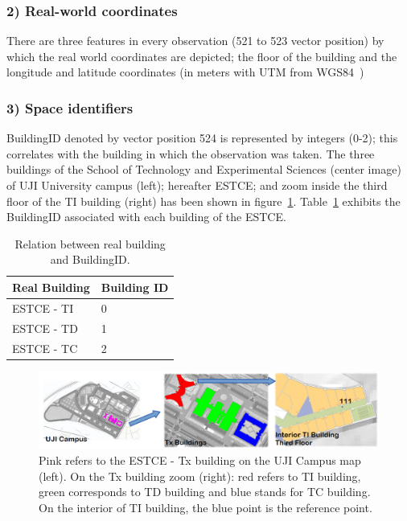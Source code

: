 \documentclass[a4paper,singleside,12pt]{report} %
\begin{document}
				\subsubsection{2) Real-world coordinates}

					There are three features in every observation (521 to 523 vector position) by which the real world coordinates are depicted; the floor of the building and the longitude and latitude coordinates (in meters with UTM from WGS84~\cite{janssen2009understanding})

				\subsubsection{3) Space identifiers}

					BuildingID denoted by vector position 524 is represented by integers (0-2); this correlates with the building in which the observation was taken. 
					The three buildings of the School of Technology and Experimental Sciences (center image) of UJI University campus (left); hereafter ESTCE; and zoom inside the third floor of the TI building (right) has been shown in figure~\ref{fig3.1}. 
					Table~\ref{table3.1} exhibits the BuildingID associated with each building of the ESTCE.

				
					\begin{table}[!htb]
					\centering
					\begin{tabular}{ll}
					\hline
					Real Building & Building ID \\ \hline
					ESTCE - TI           &0    \\
					ESTCE - TD          &1    \\
					ESTCE - TC          &2    \\ \hline
					\end{tabular}
					\caption{Relation between real building and BuildingID.}
					\label{table3.1}
					\end{table}
					
					\begin{figure}[!htb]
					\centerline{\includegraphics[width=1.2\textwidth]{./figures/map_of_buildings.png}}
					\caption[Map of the UJI Riu Sec Campus and zoom on the Tx Buildings.]{  Pink refers to the ESTCE - Tx building on the UJI Campus map (left). On the Tx building zoom (right): red refers to TI building, green corresponds to TD building and blue stands for TC building. On the interior of TI building, the blue point is the reference point.}
					\label{fig3.1}
					\end{figure}
\end{document}
